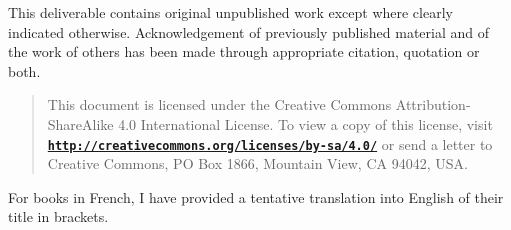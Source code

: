 \documentclass[11pt,a4paper]{article}
\newcommand{\bmurl}[1]{{\href{#1}{\texttt{\textbf{#1}}}}}
\begin{document}
This deliverable contains original unpublished work except where
clearly indicated otherwise. Acknowledgement of previously published
material and of the work of others has been made through appropriate
citation, quotation or both.




\begin{quote}
{\footnotesize {} This document
is licensed under the Creative Commons Attribution-ShareAlike 4.0
International License. To view a copy of this license, visit
\bmurl{http://creativecommons.org/licenses/by-sa/4.0/} or send a letter to
Creative Commons, PO Box 1866, Mountain View, CA 94042, USA.}
\end{quote}

\newpage

\tableofcontents

\newpage
\listoffigures

\medskip

\listoftables

\newpage



\newpage



\newpage



\newpage


\newpage




\begin{flushright}
  \begin{relsize}{-2}
    For books in French, I have provided a tentative translation into
    English of their title in brackets.
  \end{relsize}
\end{flushright}

\clearpage

\printindex
\end{document}
